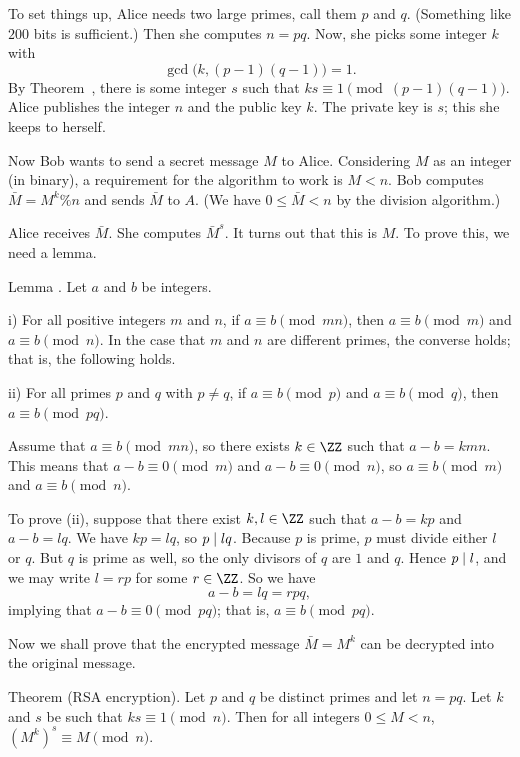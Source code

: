 To set things up, Alice needs two large primes, call them $p$ and $q$. (Something like $200$
bits is sufficient.) Then she computes $n=pq$. Now, she picks some integer $k$ with
$$\gcd\bigl(k,(p-1)(q-1)\bigr) = 1.$$
By Theorem~{\thminvertiblemodn}, there is some integer $s$ such that $ks\equiv 1\pmod{(p-1)(q-1)}$.
Alice publishes
the integer $n$ and the public key $k$. The private key is $s$; this she keeps to herself.

Now Bob wants to send a secret message $M$ to Alice. Considering $M$
as an integer (in binary), a requirement for the algorithm to work is $M<n$. Bob computes
$\bar M = M^k\percent n$ and sends $\bar M$ to $A$. (We have $0\le \bar M < n$ by the division
algorithm.)

Alice receives $\bar M$. She computes ${\bar M}^s$. It turns out that this is $M$.
To prove this, we need a lemma.

\proclaim Lemma \advthm. Let $a$ and $b$ be integers.
\medskip
\item{i)} For all positive integers $m$ and $n$,
if $a\equiv b\pmod{mn}$, then $a\equiv b\pmod m$ and $a\equiv b\pmod n$.
\medskip\noindent
In the case that $m$ and $n$ are different primes, the converse holds; that is, the following
holds.
\medskip
\item{ii)} For all primes $p$ and $q$ with $p\ne q$, if $a\equiv b\pmod p$
and $a\equiv b\pmod q$, then $a\equiv b\pmod{pq}$.
\medskip

\proof Assume that $a\equiv b\pmod{mn}$, so there exists $k\in \ZZ$ such that
$a-b = kmn$. This means that $a-b\equiv 0\pmod m$ and $a-b\equiv 0\pmod n$,
so $a\equiv b\pmod m$ and $a\equiv b\pmod n$.

To prove (ii), suppose that there exist $k,l\in \ZZ$ such that $a-b = kp$ and $a-b = lq$.
We have $kp=lq$, so $p\mid lq$. Because $p$ is prime, $p$ must divide either $l$ or $q$.
But $q$ is prime as well, so the only divisors of $q$ are $1$ and $q$. Hence $p\mid l$,
and we may write $l = rp$ for some $r\in \ZZ$. So we have
$$ a-b = lq = rpq,$$
implying that $a-b\equiv 0\pmod{pq}$; that is, $a\equiv b\pmod{pq}$.\slug

Now we shall prove that the encrypted message $\bar M = M^k$
can be decrypted into the original message.

\parenproclaim Theorem {\advthm} ({\mc RSA} encryption). Let $p$ and $q$ be distinct primes and
let $n=pq$. Let $k$ and $s$ be such that $ks\equiv 1\pmod n$. Then for all integers $0\le M < n$,
$(M^k)^s \equiv M\pmod n$.

